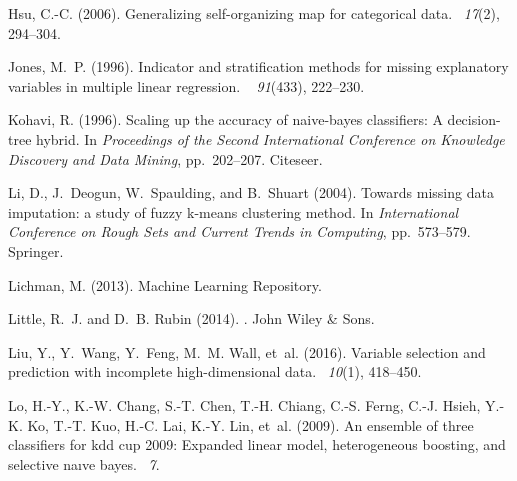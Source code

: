 \documentclass[10pt]{book}
\theoremstyle{definition}
\begin{document}
\begin{thebibliography}{11}
Hsu, C.-C. (2006).
\newblock Generalizing self-organizing map for categorical data.
~{\em 17\/}(2),
  294--304.
  
\clearpage
\markboth{\hfill{\footnotesize\rm } \hfill}
{\hfill {\footnotesize\rm } \hfill}

Jones, M.~P. (1996).
\newblock Indicator and stratification methods for missing explanatory
  variables in multiple linear regression.
~{\em
  91\/}(433), 222--230.

Kohavi, R. (1996).
\newblock Scaling up the accuracy of naive-bayes classifiers: A decision-tree
  hybrid.
\newblock In {\em Proceedings of the Second International Conference on
  Knowledge Discovery and Data Mining}, pp.\  202--207. Citeseer.

Li, D., J.~Deogun, W.~Spaulding, and B.~Shuart (2004).
\newblock Towards missing data imputation: a study of fuzzy k-means clustering
  method.
\newblock In {\em International Conference on Rough Sets and Current Trends in
  Computing}, pp.\  573--579. Springer.

Lichman, M. (2013).
 {M}achine {L}earning {R}epository.

Little, R.~J. and D.~B. Rubin (2014).
.
\newblock John Wiley \& Sons.

Liu, Y., Y.~Wang, Y.~Feng, M.~M. Wall, et~al. (2016).
\newblock Variable selection and prediction with incomplete high-dimensional
  data.
~{\em 10\/}(1), 418--450.

Lo, H.-Y., K.-W. Chang, S.-T. Chen, T.-H. Chiang, C.-S. Ferng, C.-J. Hsieh,
  Y.-K. Ko, T.-T. Kuo, H.-C. Lai, K.-Y. Lin, et~al. (2009).
\newblock An ensemble of three classifiers for kdd cup 2009: Expanded linear
  model, heterogeneous boosting, and selective na{\i}ve bayes.
~{\em 7}.


\end{thebibliography}
\end{document}
